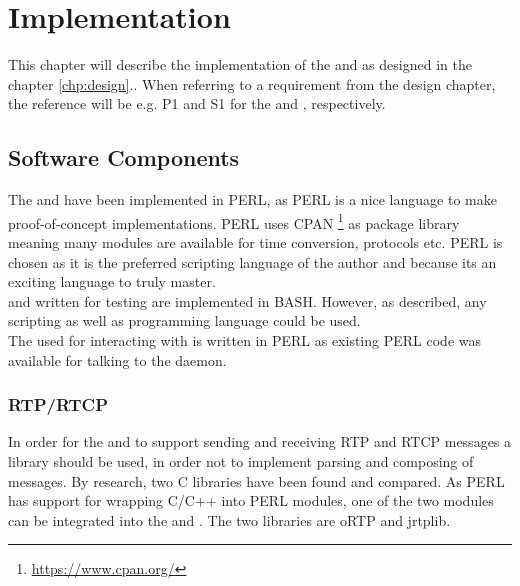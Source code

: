 \chapter{Implementation} \label{chp:implementation}
This chapter will describe the implementation of the \pub{} and \sub{} as designed in the chapter \ref{chp:design}.. When referring to a requirement from the design chapter, the reference will be e.g. P1 and S1 for the \pub{} and \sub{}, respectively. 

\section{Software Components}
The \pub{} and \sub{} have been implemented in PERL, as PERL is a nice language to make proof-of-concept implementations. PERL uses CPAN \footnote{\url{https://www.cpan.org/}} as package library meaning many modules are available for time conversion, protocols etc. PERL is chosen as it is the preferred scripting language of the author and because its an exciting language to truly master.\\

\noindent{}\pros{} and \cons{} written for testing are implemented in BASH. However, as described, any scripting as well as programming language could be used.\\

\noindent{} The \pro{} used for interacting with  is written in PERL as existing PERL code was available for talking to the  daemon.

\subsection{RTP/RTCP}
In order for the \pub{} and \sub{} to support sending and receiving RTP and RTCP messages a library should be used, in order not to implement parsing and composing of messages. By research, two C libraries have been found and compared. As PERL has support for wrapping C/C++ into PERL modules, one of the two modules can be integrated into the \subs{} and \pubs{}. The two libraries are oRTP and jrtplib.\\

